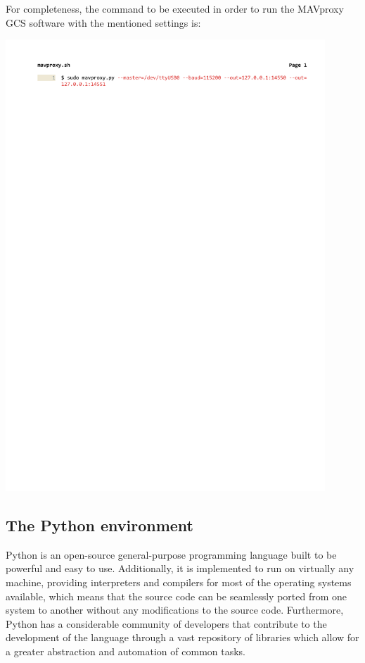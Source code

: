 For completeness, the command to be executed in order to run the MAVproxy GCS software with the mentioned settings is:
\begin{center}
\includegraphics[width=0.9\textwidth,clip,trim={2.5cm 26.6cm 1cm 2.3cm}]{./figures/mavproxysh.pdf}
\end{center}


\subsection{The Python environment}

Python is an open-source general-purpose programming language built to be powerful and easy to use.
Additionally, it is implemented to run on virtually any machine, providing interpreters and compilers for most of the operating systems available, which means that the source code can be seamlessly ported from one system to another without any modifications to the source code.
Furthermore, Python has a considerable community of developers that contribute to the development of the language through a vast repository of libraries which allow for a greater abstraction and automation of common tasks.


